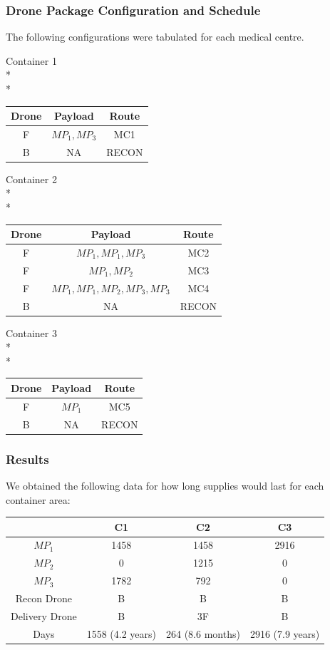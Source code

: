 \documentclass[a4paper,12pt]{article}
\begin{document}
\subsubsection{Drone Package Configuration and Schedule}

The following configurations were tabulated for each medical centre.



Container 1\\*\\*
\begin{tabular}{ |c|c|c| }
 \hline
 Drone & Payload & Route \\\hline
  F & $MP_1,MP_3$ & MC1 \\
  B & NA & RECON \\
 \hline
\end{tabular}

Container 2\\*\\*
\begin{tabular}{ |c|c|c| }
 \hline
 Drone & Payload & Route \\\hline
  F & $MP_1,MP_1,MP_3$ & MC2 \\
  F & $MP_1,MP_2$ & MC3   \\
  F &  $MP_1,MP_1,MP_2,MP_3,MP_3$ & MC4 \\
  B & NA & RECON \\
 \hline
\end{tabular}

Container 3\\*\\*
\begin{tabular}{ |c|c|c| }
 \hline
 Drone & Payload & Route \\\hline
  F & $MP_1$ & MC5 \\
  B & NA & RECON \\
 \hline
\end{tabular}

\subsubsection{Results}
We obtained the following data for how long supplies would last for each container area:

\begin{center}
\begin{tabular}{ |c|c|c|c| }
 \hline
  & C1 & C2 & C3 \\\hline
  $MP_1$ & 1458 & 1458 & 2916 \\
  $MP_2$ & 0 & 1215 & 0  \\
  $MP_3$ & 1782 & 792 & 0 \\
  Recon Drone & B & B & B \\
  Delivery Drone & B & 3F & B \\
  Days & 1558 (4.2 years) & 264 (8.6 months) & 2916 (7.9 years) \\
 \hline
\end{tabular}
\end{center}
\end{document}
